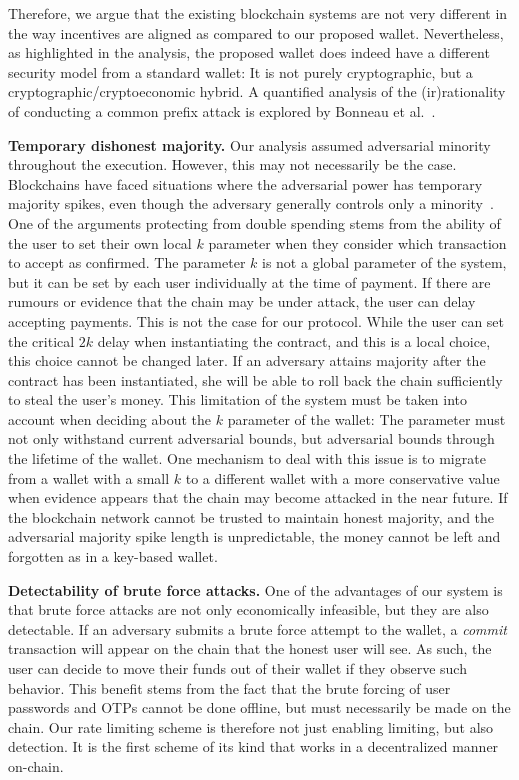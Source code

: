 Therefore, we argue that the existing blockchain systems are not very
different in the way incentives are aligned as compared to our proposed
wallet. Nevertheless, as highlighted in the analysis, the proposed wallet
does indeed have a different security model from a standard wallet: It
is not purely cryptographic, but a cryptographic/cryptoeconomic hybrid.
A quantified analysis of the (ir)rationality of conducting a common prefix
attack is explored by Bonneau et al.~\cite{bonneau2015bitcoin}.

\noindent
\textbf{Temporary dishonest majority.}
Our analysis assumed adversarial minority
throughout the execution. However, this may not necessarily be the case.
Blockchains have faced situations where
the adversarial power has temporary majority spikes,
even though the adversary generally controls only a
minority~\cite{temporary-dishonest,supremacy}.
One of the arguments protecting from double spending stems from
the ability of the user to set their own local $k$ parameter when they
consider which transaction to accept as confirmed. The parameter $k$ is
not a global parameter of the system, but it can be set by each user
individually at the time of payment. If there are rumours or evidence
that the chain may be under attack, the user can delay accepting payments.
This is not the case for our protocol. While the user can set the critical
$2k$ delay when instantiating the contract, and this is a local choice,
this choice cannot be changed later. If an adversary attains majority
after the contract has been instantiated, she will be able to roll
back the chain sufficiently to steal the user's money. This limitation
of the system must be taken into account when deciding about the $k$
parameter of the wallet: The parameter must not only withstand current
adversarial bounds, but adversarial bounds through the lifetime of the
wallet. One mechanism to deal with this issue is to migrate from a
wallet with a small $k$ to a different wallet with a more
conservative value when evidence appears that the chain may become
attacked in the near future. If the blockchain network cannot be
trusted to maintain honest majority, and the adversarial majority spike
length is unpredictable, the money cannot be left and forgotten
as in a key-based wallet.

\noindent
\textbf{Detectability of brute force attacks.}
One of the advantages of our system is that brute force attacks are
not only economically infeasible, but they are also detectable. If an
adversary submits a brute force attempt to the wallet, a \emph{commit}
transaction will appear on the chain that the honest user will see.
As such, the user can decide to move their funds out of their wallet
if they observe such behavior. This benefit stems from the fact that
the brute forcing of user passwords and OTPs cannot be done offline,
but must necessarily be made on the chain. Our rate limiting scheme
is therefore not just enabling limiting, but also detection. It is
the first scheme of its kind that works in a decentralized manner
on-chain.
